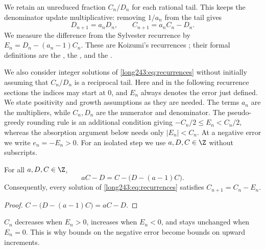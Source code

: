 We retain an unreduced fraction $C_n/D_n$ for each rational tail.
This keeps the denominator update multiplicative: removing $1/a_n$
from the tail gives
\begin{equation}\label{long243:eq:recurrences}
 D_{n+1}=a_nD_n,\qquad C_{n+1}=a_nC_n-D_n.
\end{equation}
We measure the difference from the Sylvester recurrence by
$E_n=D_n-(a_n-1)C_n$. These are Koizumi's recurrences
\cite[Lemma~4, pp.~11--12]{koizumi2025}; their formal definitions are the
, the
,
and the
.

We also consider integer solutions of \eqref{long243:eq:recurrences}
without initially assuming that $C_n/D_n$ is a reciprocal tail.
Here and in the following recurrence sections the indices may start
at $0$, and $E_n$ always denotes the error just defined. We state
positivity and growth assumptions as they are needed. The terms $a_n$
are the multipliers, while $C_n,D_n$ are the numerator and denominator.
The pseudo-greedy rounding rule is an additional condition giving $-C_n/2\le E_n<C_n/2$, whereas the
absorption argument below needs only $|E_n|<C_n$. At a negative error we
write $e_n=-E_n>0$. For an isolated step we use $a,D,C\in\Z$ without
subscripts.

\begin{proposition}\label{long243:res:update}
For all $a,D,C\in\Z$,
\[
 aC-D=C-\bigl(D-(a-1)C\bigr).
\]
Consequently, every solution of \eqref{long243:eq:recurrences} satisfies $C_{n+1}=C_n-E_n$.
\end{proposition}

\begin{proof}
$C-\bigl(D-(a-1)C\bigr)=aC-D$.
\end{proof}

$C_n$ decreases when $E_n>0$, increases when $E_n<0$, and
stays unchanged when $E_n=0$. This is why bounds on the negative error
become bounds on upward increments.

